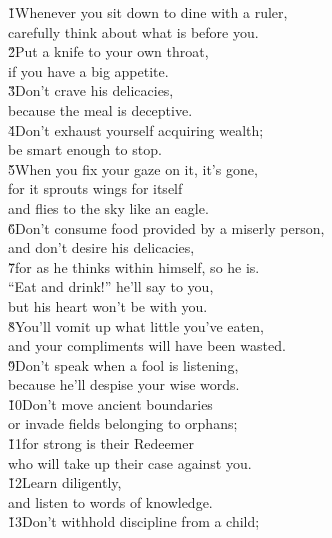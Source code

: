 \begin{poetry}
\poeml {}
\v{1}Whenever you sit down to dine with a ruler, \\
\poeml carefully think about what is before you. \\
\poeml \v{2}Put a knife to your own throat, \\
\poemll    if you have a big appetite. \\
\poeml \v{3}Don't crave his delicacies, \\
\poemll    because the meal is deceptive. \\
\poeml \v{4}Don't exhaust yourself acquiring wealth; \\
\poemll    be smart enough to stop. \\
\poeml \v{5}When you fix your gaze on it, it's gone, \\
\poemll    for it sprouts wings for itself \\
\poemlll       and flies to the sky like an eagle. \\
\poeml \v{6}Don't consume food provided by a miserly person, \\
\poemll    and don't desire his delicacies, \\
\poeml \v{7}for as he thinks within himself, so he is. \\
\poemll    ``Eat and drink!'' he'll say to you, \\
\poemlll       but his heart won't be with you. \\
\poeml \v{8}You'll vomit up what little you've eaten, \\
\poemll    and your compliments will have been wasted. \\
\poeml \v{9}Don't speak when a fool is listening, \\
\poemll    because he'll despise your wise words. \\
\poeml \v{10}Don't move ancient boundaries \\
\poemll    or invade fields belonging to orphans; \\
\poeml \v{11}for strong is their Redeemer \\
\poemll    who will take up their case against you. \\
\poeml \v{12}Learn diligently, \\
\poemll    and listen to words of knowledge. \\
\poeml \v{13}Don't withhold discipline from a child; \\

\end{poetry}
